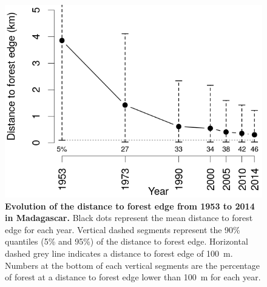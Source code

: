 \documentclass[a4paper, 12pt, leqno]{article}\usepackage[]{graphicx}\usepackage[]{color}
\begin{document}
\begin{figure}[h!]
  \centering
  
  \includegraphics[width=12cm]{figs/dist.png}

  \caption{\textbf{Evolution of the distance to forest edge from 1953
      to 2014 in Madagascar.} Black dots represent the mean distance
    to forest edge for each year. Vertical dashed segments represent
    the 90\% quantiles (5\% and 95\%) of the distance to forest
    edge. Horizontal dashed grey line indicates a distance to forest
    edge of 100~m. Numbers at the bottom of each vertical segments are
    the percentage of forest at a distance to forest edge lower than
    100~m for each year.}
  
  \label{fig:dist_edge}

\end{figure}
\end{document}

